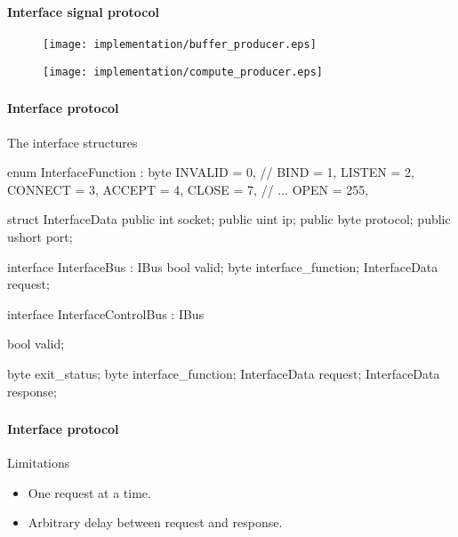 \begin{frame}[fragile]
    \frametitle{\ImplementationTitle}
    \framesubtitle{Interface signal protocol}
    \begin{minipage}[t]{0.5\textwidth}
        \begin{figure}
                \centering
                \texttt{[image: implementation/buffer\_producer.eps]}
        \end{figure}
    \end{minipage}%
    \hfill%
    \begin{minipage}[t]{0.5\textwidth}
        \begin{figure}
                \centering
                \texttt{[image: implementation/compute\_producer.eps]}
        \end{figure}
    \end{minipage}
\end{frame}





\begin{frame}[fragile]
    \frametitle{\ImplementationTitle}
    \framesubtitle{Interface protocol}
    The interface structures\\
    \begin{minipage}[t]{0.4\textwidth}
        \begin{mintedcsharp}
            enum InterfaceFunction : byte
            {
                INVALID = 0,
                // BIND = 1,
                LISTEN = 2,
                CONNECT = 3,
                ACCEPT = 4,
                CLOSE = 7,
                // ...
                OPEN = 255,
            }

            struct InterfaceData
            {
                public int socket;
                public uint ip;
                public byte protocol;
                public ushort port;
            }
        \end{mintedcsharp}
    \end{minipage}%
    \hfill%
    \begin{minipage}[t]{0.4\textwidth}
        \begin{mintedcsharp}
            interface InterfaceBus : IBus
            {
                bool valid;
                byte interface_function;
                InterfaceData request;
            }

            interface InterfaceControlBus : IBus
            {
                bool valid;

                byte exit_status;
                byte interface_function;
                InterfaceData request;
                InterfaceData response;
            }
        \end{mintedcsharp}
    \end{minipage}
\end{frame}


\begin{frame}%
    \frametitle{\ImplementationTitle}
    \framesubtitle{Interface protocol}
    Limitations
    \begin{itemize}
        \item One request at a time.
        \item Arbitrary delay between request and response.
    \end{itemize}
\end{frame}

